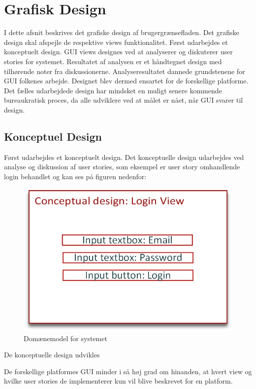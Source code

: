 \chapter{Grafisk Design}
I dette afsnit beskrives det grafiske design af brugergrænsefladen. Det grafiske design skal afspejle de respektive views funktionalitet. Først udarbejdes et konceptuelt design. GUI views designes ved at analyserer og diskuterer user stories for systemet. Resultatet af analysen er et håndtegnet design med tilhørende noter fra diskussionerne. Analyseresultatet dannede grundstenene for GUI folkenes arbejde. Designet blev dermed ensartet for de forskellige platforme. Det fælles udarbejdede design har mindsket en muligt senere kommende bureaukratisk proces, da alle udviklere ved at målet er nået, når GUI svarer til design. 

\section{Konceptuel Design}
Først udarbejdes et konceptuelt design. Det konceptuelle design udarbejdes ved analyse og diskussion af user stories, som eksempel er user story omhandlende login behandlet og kan ses på figuren nedenfor:

\begin{figure}
	\centering
	\includegraphics[width=\linewidth]{figs/design/concuptuel_design_loginview}
	\caption{Domænemodel for systemet}
	\label{fig:domainmodel}
\end{figure}

De konceptuelle design udvikles

De forskellige platformes GUI minder i så høj grad om hinanden, at hvert view og hvilke user stories de implementerer kun vil blive beskrevet for en platform. 